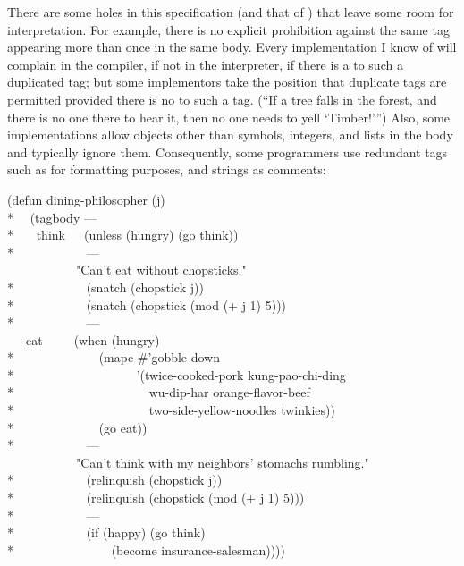 \begin{defspec}
\begin{new}
There are some holes in this specification (and that of ) that
leave some room for interpretation.  For example, there is no explicit
prohibition against the same tag appearing more than once in the same
 body.  Every implementation I know of will complain
in the compiler, if not in the interpreter, if there is a  to
such a duplicated tag; but some implementors take the position
that duplicate tags are permitted provided there is no  to
such a tag.  (``If a tree falls in the forest, and there is no one
there to hear it, then no one needs to yell `Timber!'\thinspace'')
Also, some implementations allow objects other than symbols, integers,
and lists in the body and typically ignore them.
Consequently,
some programmers use redundant tags such as \cdf{---} for formatting purposes,
and strings as comments:
\begin{lisp}
(defun dining-philosopher (j) \\*
~~(tagbody --- \\*
~~~think~~~(unless (hungry) (go think)) \\*
~~~~~~~~~~~--- \\
~~~~~~~~~~~"Can't eat without chopsticks." \\*
~~~~~~~~~~~(snatch (chopstick j)) \\*
~~~~~~~~~~~(snatch (chopstick (mod (+ j 1) 5))) \\*
~~~~~~~~~~~--- \\
~~~eat~~~~~(when (hungry) \\*
~~~~~~~~~~~~~(mapc \#'gobble-down \\*
~~~~~~~~~~~~~~~~~~~'(twice-cooked-pork kung-pao-chi-ding \\*
~~~~~~~~~~~~~~~~~~~~~wu-dip-har orange-flavor-beef \\*
~~~~~~~~~~~~~~~~~~~~~two-side-yellow-noodles twinkies)) \\*
~~~~~~~~~~~~~(go eat)) \\*
~~~~~~~~~~~--- \\
~~~~~~~~~~~"Can't think with my neighbors' stomachs rumbling." \\*
~~~~~~~~~~~(relinquish (chopstick j)) \\*
~~~~~~~~~~~(relinquish (chopstick (mod (+ j 1) 5))) \\*
~~~~~~~~~~~--- \\*
~~~~~~~~~~~(if (happy) (go think) \\*
~~~~~~~~~~~~~~~(become insurance-salesman))))
\end{lisp}

\end{new}
\end{defspec}
